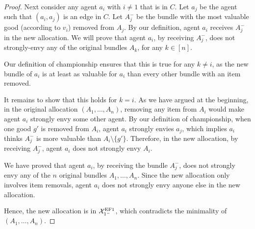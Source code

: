 \begin{proof}
    Next consider any agent $a_i$ with $i\neq 1$ that is in $C$.
    Let $a_j$ be the agent such that $(a_i,a_j)$ is an edge in $C$.
    Let $A_j^-$ be the bundle with the most valuable good (according to $v_i$) removed from $A_j$.
    By our definition, agent $a_i$ receives $A_j^-$ in the new allocation.
    We will prove that agent $a_i$, by receiving $A_j^-$, does not strongly-envy any of the original bundles $A_k$, for any $k\in [n]$.
    
    Our definition of championship ensures that this is true for any $k\neq i$, as the new bundle of $a_i$ is at least as valuable for $a_i$ than every other bundle with an item removed.
    
    It remains to show that this holds for $k=i$.
    As we have argued at the beginning, in the original allocation $(A_1,\ldots,A_n)$, removing any item from $A_i$ would make agent $a_i$ strongly envy some other agent.
    By our definition of championship, when one good $g'$ is removed from $A_i$, agent $a_i$ strongly envies $a_j$, which implies $a_i$ thinks $A_j^-$ is more valuable than $A_i\setminus\{g'\}$.
    Therefore, in the new allocation, by receiving $A_j^-$, agent $a_i$ does not strongly envy $A_i$.
    
    We have proved that agent $a_i$, by receiving the bundle $A_j^-$, does not strongly envy any of the $n$ original bundles $A_1,\ldots,A_n$.
    Since the new allocation only involves item removals, agent $a_i$ does not strongly envy anyone else in the new allocation.
    
    Hence, the new allocation is in $\mathcal{X}^{\mathrm{EF1}}_{1^-}$, which contradicts the minimality of $(A_1,\ldots,A_n)$.
\end{proof}

